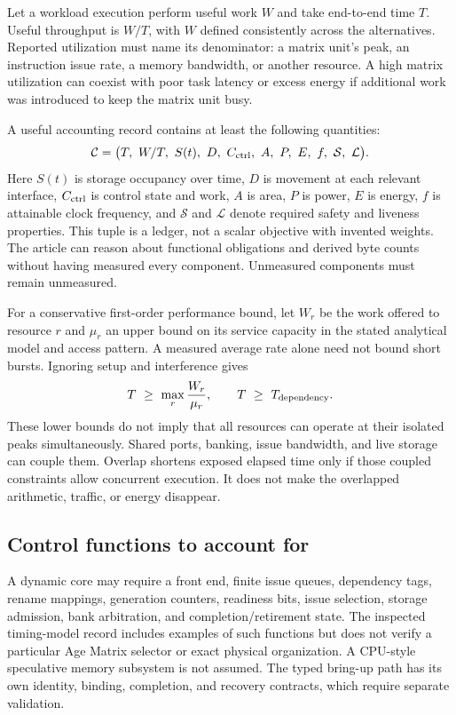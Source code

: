 Let a workload execution perform useful work $W$ and take end-to-end time $T$. Useful throughput is $W/T$, with $W$ defined consistently across the alternatives. Reported utilization must name its denominator: a matrix unit's peak, an instruction issue rate, a memory bandwidth, or another resource. A high matrix utilization can coexist with poor task latency or excess energy if additional work was introduced to keep the matrix unit busy.

A useful accounting record contains at least the following quantities:
\begin{equation}
 \mathcal{C}=\bigl(T,\ W/T,\ S(t),\ D,\ C_{\rm ctrl},\ A,\ P,\ E,\ f,\ \mathcal{S},\ \mathcal{L}\bigr).
\end{equation}
Here $S(t)$ is storage occupancy over time, $D$ is movement at each relevant interface, $C_{\rm ctrl}$ is control state and work, $A$ is area, $P$ is power, $E$ is energy, $f$ is attainable clock frequency, and $\mathcal{S}$ and $\mathcal{L}$ denote required safety and liveness properties. This tuple is a ledger, not a scalar objective with invented weights. The article can reason about functional obligations and derived byte counts without having measured every component. Unmeasured components must remain unmeasured.

For a conservative first-order performance bound, let $W_r$ be the work offered to resource $r$ and $\mu_r$ an upper bound on its service capacity in the stated analytical model and access pattern. A measured average rate alone need not bound short bursts. Ignoring setup and interference gives
\begin{equation}
 T\ \geq\ \max_r\frac{W_r}{\mu_r},\qquad
 T\ \geq\ T_{\rm dependency}.
 \label{eq:resource-bound}
\end{equation}
These lower bounds do not imply that all resources can operate at their isolated peaks simultaneously. Shared ports, banking, issue bandwidth, and live storage can couple them. Overlap shortens exposed elapsed time only if those coupled constraints allow concurrent execution. It does not make the overlapped arithmetic, traffic, or energy disappear.

\subsection{Control functions to account for}

A dynamic core may require a front end, finite issue queues, dependency tags, rename mappings, generation counters, readiness bits, issue selection, storage admission, bank arbitration, and completion/retirement state. The inspected timing-model record includes examples of such functions but does not verify a particular Age Matrix selector or exact physical organization. A CPU-style speculative memory subsystem is not assumed. The typed bring-up path has its own identity, binding, completion, and recovery contracts, which require separate validation.

